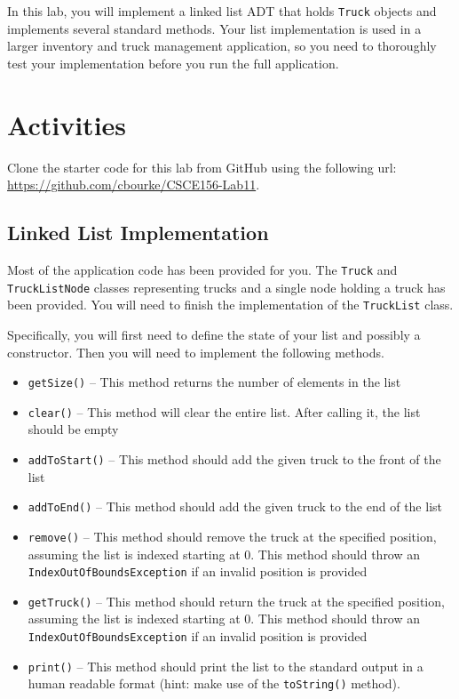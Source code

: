 \documentclass[12pt]{scrartcl}
\begin{document}
In this lab, you will implement a linked list ADT that holds 
\texttt{Truck} objects and implements several standard 
methods.  Your list implementation is used in a larger inventory 
and truck management application, so you need to thoroughly 
test your implementation before you run the full application.

\section*{Activities}

Clone the starter code for this lab from GitHub using the following
url: \url{https://github.com/cbourke/CSCE156-Lab11}.

\subsection*{Linked List Implementation}

Most of the application code has been provided for you.  The 
\texttt{Truck} and \texttt{TruckListNode} 
classes representing trucks and a single node holding a truck has
been provided.  You will need to finish the implementation of the 
\texttt{TruckList} class.  

Specifically, you will first need to define the state of your list
and possibly a constructor.  Then you will need to implement the 
following methods.

\begin{itemize}
  \item \texttt{getSize()} -- This method returns the
  	number of elements in the list
  \item \texttt{clear()} -- This method will clear the 
  	entire list.  After calling it, the list should be empty
  \item \texttt{addToStart()} -- This method should add 
	the given truck to the front of the list
  \item \texttt{addToEnd()}  -- This method should add the 
	given truck to the end of the list
  \item \texttt{remove()} -- This method should remove the 
	truck at the specified position, assuming the list is indexed 
	starting at 0.  This method should throw an \\
	\texttt{IndexOutOfBoundsException} if an invalid 
	position is provided
  \item \texttt{getTruck()} -- This method should return 
	the truck at the specified position, assuming the list is indexed 
	starting at 0.  This method should throw an \\
	\texttt{IndexOutOfBoundsException} 
	if an invalid position is provided
  \item \texttt{print()} -- This method should print the 
	list to the standard output in a human readable format (hint: 
	make use of the \texttt{toString()} method).
\end{itemize}
\end{document}
